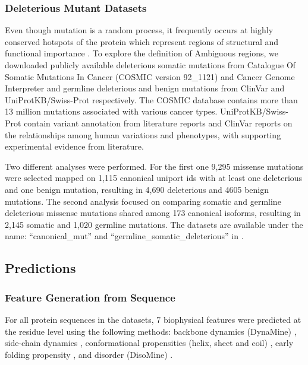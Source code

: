 \subsubsection{Deleterious Mutant Datasets}
Even though mutation is a random process, it frequently occurs at highly conserved hotspots of the protein which represent regions of structural and functional importance \cite{chang_accelerating_2018}. To explore the definition of Ambiguous regions, we downloaded publicly available deleterious somatic mutations from Catalogue Of Somatic Mutations In Cancer (COSMIC version 92_1121) \cite{forbes_catalogue_2008} and Cancer Genome Interpreter \cite{tamborero_cancer_2018} and germline deleterious and benign mutations from ClinVar \cite{landrum_clinvar_2018} and UniProtKB/Swiss-Prot \cite{the_uniprot_consortium_uniprot_2021} respectively. The COSMIC database contains more than 13 million mutations associated with various cancer types. UniProtKB/Swiss-Prot contain variant annotation from literature reports and ClinVar reports on the relationships among human variations and phenotypes, with supporting experimental evidence from literature. 

Two different analyses were performed. For the first one 9,295 missense mutations were selected mapped on 1,115 canonical uniport ids with at least one deleterious and one benign mutation, resulting in 4,690 deleterious and 4605 benign mutations. The second analysis focused on comparing somatic and germline deleterious missense mutations shared among 173 canonical isoforms, resulting in 2,145 somatic and 1,020 germline mutations. The datasets are available under the name: ``canonical_mut'' and ``germline_somatic_deleterious'' in .


\subsection{Predictions}
\subsubsection{Feature Generation from Sequence}

For all protein sequences in the datasets, 7 biophysical features were predicted at the residue level using the following methods: backbone dynamics (DynaMine) \cite{cilia_protein_2013}, side-chain dynamics \cite{raimondi_exploring_2017}, conformational propensities (helix, sheet and coil) \cite{raimondi_exploring_2017}, early folding propensity \cite{raimondi_exploring_2017}, and disorder (DisoMine) \cite{orlando_prediction_2022}.


